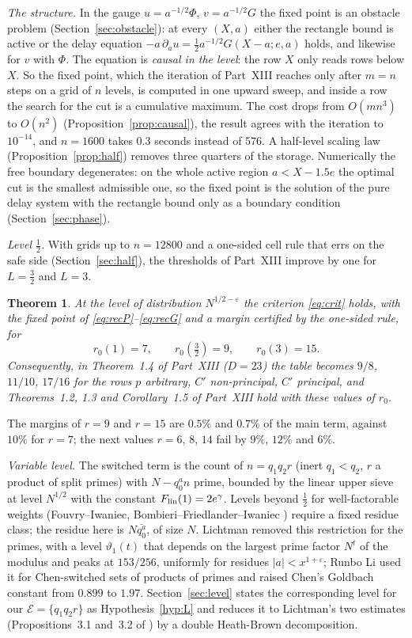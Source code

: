 \documentclass[11pt]{amsart}
\newtheorem{theorem}{Theorem}[section]
\theoremstyle{remark}
\newcommand{\e}{\varepsilon}
\newcommand{\cE}{\mathcal E}
\begin{document}
\emph{The structure.} In the gauge $u=a^{-1/2}\Phi$, $v=a^{-1/2}G$ the fixed point is an obstacle problem (Section~\ref{sec:obstacle}): at every $(X,a)$ either the rectangle bound is active or the delay equation $-a\,\partial_au=\frac12a^{-1/2}G(X-a;e,a)$ holds, and likewise for $v$ with $\Phi$. The equation is \emph{causal in the level}: the row $X$ only reads rows below $X$. So the fixed point, which the iteration of Part~XIII reaches only after $m=n$ steps on a grid of $n$ levels, is computed in one upward sweep, and inside a row the search for the cut is a cumulative maximum. The cost drops from $O(mn^3)$ to $O(n^2)$ (Proposition~\ref{prop:causal}), the result agrees with the iteration to $10^{-14}$, and $n=1600$ takes $0.3$ seconds instead of $576$. A half-level scaling law (Proposition~\ref{prop:half}) removes three quarters of the storage. Numerically the free boundary degenerates: on the whole active region $a<X-1.5e$ the optimal cut is the smallest admissible one, so the fixed point is the solution of the pure delay system with the rectangle bound only as a boundary condition (Section~\ref{sec:phase}).

\emph{Level $\frac12$.} With grids up to $n=12800$ and a one-sided cell rule that errs on the safe side (Section~\ref{sec:half}), the thresholds of Part~XIII improve by one for $L=\frac32$ and $L=3$.

\begin{theorem}\label{thm:half}
At the level of distribution $N^{1/2-\e}$ the criterion \eqref{eq:crit} holds, with the fixed point of \eqref{eq:recP}--\eqref{eq:recG} and a margin certified by the one-sided rule, for
\[
r_0(1)=7,\qquad r_0(\tfrac32)=9,\qquad r_0(3)=15 .
\]
Consequently, in Theorem~1.4 of Part~XIII ($D=23$) the table becomes $9/8$, $11/10$, $17/16$ for the rows $p$ arbitrary, $C'$ non-principal, $C'$ principal, and Theorems~1.2, 1.3 and Corollary~1.5 of Part~XIII hold with these values of $r_0$.
\end{theorem}
The margins of $r=9$ and $r=15$ are $0.5\%$ and $0.7\%$ of the main term, against $10\%$ for $r=7$; the next values $r=6$, $8$, $14$ fail by $9\%$, $12\%$ and $6\%$.

\emph{Variable level.} The switched term is the count of $n=q_1q_2r$ (inert $q_1<q_2$, $r$ a product of split primes) with $N-q_0^an$ prime, bounded by the linear upper sieve at level $N^{1/2}$ with the constant $F_{\rm lin}(1)=2e^\gamma$. Levels beyond $\frac12$ for well-factorable weights (Fouvry--Iwaniec, Bombieri--Friedlander--Iwaniec \cite{FI,BFI}) require a fixed residue class; the residue here is $N\overline{q_0^a}$, of size $N$. Lichtman \cite{Lichtman} removed this restriction for the primes, with a level $\vartheta_1(t)$ that depends on the largest prime factor $N^{t}$ of the modulus and peaks at $153/256$, uniformly for residues $|a|<x^{1+\e}$; Runbo Li \cite{Li} used it for Chen-switched sets of products of primes and raised Chen's Goldbach constant from $0.899$ to $1.97$. Section~\ref{sec:level} states the corresponding level for our $\cE=\{q_1q_2r\}$ as Hypothesis~\ref{hyp:L} and reduces it to Lichtman's two estimates (Propositions~3.1 and~3.2 of \cite{Lichtman}) by a double Heath-Brown decomposition.
\end{document}

